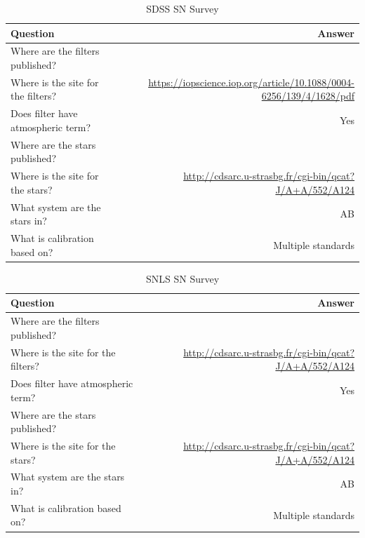 \documentclass[twocolumn]{aastex63}
\begin{document}
\begin{table}
\label{table:information}
\caption{\large SDSS SN Survey}
\begin{tabular}{lr}
\toprule
    Question & Answer \\
\hline

Where are the filters published? & \cite{SDSS} \\
Where is the site for the filters? & \href{https://iopscience.iop.org/article/10.1088/0004-6256/139/4/1628/pdf}{https://iopscience.iop.org/article/10.1088/0004-6256/139/4/1628/pdf} \\
Does filter have atmospheric term?	& Yes \\
Where are the stars published? & \cite{sdssstars} \\
Where is the site for the stars? & \href{http://cdsarc.u-strasbg.fr/cgi-bin/qcat?J/A+A/552/A124}{http://cdsarc.u-strasbg.fr/cgi-bin/qcat?J/A+A/552/A124} \\
What system are the stars in? & AB \\
What is calibration based on? & Multiple standards \\

\end{tabular}
\end{table}


\begin{table}
\label{table:information}
\caption{\large SNLS SN Survey}
\begin{tabular}{lr}
\toprule
    Question & Answer \\
\hline

Where are the filters published? & \cite{SNLS} \\
Where is the site for the filters? & \href{http://cdsarc.u-strasbg.fr/cgi-bin/qcat?J/A+A/552/A124}{http://cdsarc.u-strasbg.fr/cgi-bin/qcat?J/A+A/552/A124} \\
Does filter have atmospheric term?	& Yes \\
Where are the stars published? & \cite{sdssstars} \\
Where is the site for the stars? & \href{http://cdsarc.u-strasbg.fr/cgi-bin/qcat?J/A+A/552/A124}{http://cdsarc.u-strasbg.fr/cgi-bin/qcat?J/A+A/552/A124} \\
What system are the stars in? & AB \\
What is calibration based on? & Multiple standards \\

\end{tabular}
\end{table}
\end{document}
